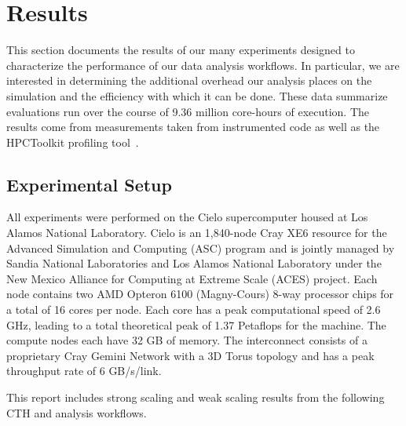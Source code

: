 \section{Results}
\label{sec:Results}

This section documents the results of our many experiments designed to
characterize the performance of our data analysis workflows.  In
particular, we are interested in determining the additional overhead our
analysis places on the simulation and the efficiency with which it can be
done.  These data summarize evaluations run over the course of 9.36 million
core-hours of execution.  The results come from measurements taken from
instrumented code as well as the HPCToolkit profiling
tool~\cite{adhianto:hpctoolkit}. 

\subsection{Experimental Setup}

All experiments were performed on the Cielo supercomputer housed at Los Alamos
National Laboratory.  Cielo is an 1,840-node Cray XE6 resource for the Advanced
Simulation and Computing (ASC) program and is jointly managed by Sandia National
Laboratories and Los Alamos National Laboratory under the New Mexico
Alliance for Computing at Extreme Scale (ACES) project.  Each node contains
two AMD Opteron 6100 (Magny-Cours) 8-way processor chips for a total of 16 cores
per node.  Each core has a peak computational speed of 2.6 GHz, leading to a total
theoretical peak of 1.37 Petaflops for the machine. The compute nodes each
have 32 GB of memory.  The interconnect consists of a proprietary Cray Gemini
Network with a 3D Torus topology and has a peak throughput rate of 6 GB/s/link.

This report includes strong scaling and weak scaling results from the
following CTH and analysis workflows.

